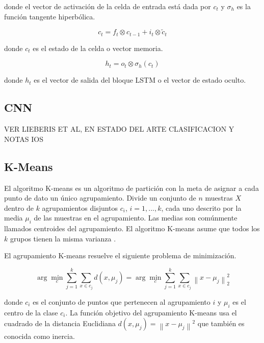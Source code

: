 donde el vector de activación de la celda de entrada está dada por $c_t$ y $\sigma_{h}$ es la función tangente hiperbólica.

\begin{equation}
	c_{t}=f_{t} \otimes c_{t-1}+i_{t} \otimes \tilde{c}_{t}
\end{equation}

donde $c_t$ es el estado de la celda o vector memoria.

\begin{equation}
	h_{t}=o_{t} \otimes \sigma_{h}\left(c_{t}\right)
	\label{LSTM2}
\end{equation}

donde $h_t$ es el vector de salida del bloque LSTM o el vector de estado oculto. 


\subsection{CNN}
VER LIEBERIS ET AL, EN ESTADO DEL ARTE CLASIFICACION Y NOTAS IOS


\subsection{K-Means}

El algoritmo K-means es un algoritmo de partición con la meta de asignar a cada punto de dato un único agrupamiento. Divide un conjunto de $n$ muestras $X$ dentro de $k$ agrupamientos disjuntos $c_i$, $i=1,...,k$, cada uno descrito por la media $\mu_i$ de las muestras en el agrupamiento. Las medias son comúnmente llamados centroides del agrupamiento. El algoritmo K-means asume que todos los $k$ grupos tienen la misma varianza \cite{igualIntroductionDataScience2017}.

El agrupamiento K-means resuelve el siguiente problema de minimización. 

\begin{equation}
	\arg \min _{c} \sum_{j=1}^{k} \sum_{x \in c_{j}} d\left(x, \mu_{j}\right)=\arg \min _{c} \sum_{j=1}^{k} \sum_{x \in c_{j}}\left\|x-\mu_{j}\right\|_{2}^{2}
\end{equation}

donde $c_i$ es el conjunto de puntos que pertenecen al agrupamiento $i$ y $\mu_i$ es el centro de la clase $c_i$. La función objetivo del agrupamiento K-means usa el cuadrado de la distancia Euclidiana $d\left(x, \mu_{j}\right)=\left\|x-\mu_{j}\right\|^{2}$ que también es conocida como inercia.

